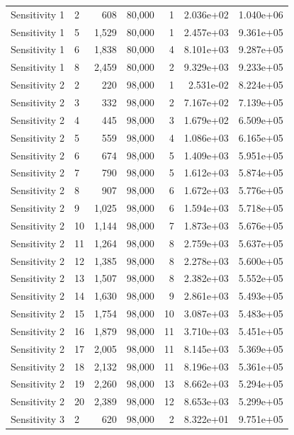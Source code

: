 \begin{xltabular}{\linewidth}{llrrrrr}
 Sensitivity 1 & 2 & 608 &  80,000 &   1 & 2.036e+02 & 1.040e+06 \\
 Sensitivity 1 & 5 & 1,529 &  80,000 &   1 & 2.457e+03 & 9.361e+05 \\
 Sensitivity 1 & 6 & 1,838 &  80,000 &   4 & 8.101e+03 & 9.287e+05 \\
 Sensitivity 1 & 8 & 2,459 &  80,000 &   2 & 9.329e+03 & 9.233e+05 \\
 Sensitivity 2 & 2 & 220 &  98,000 &   1 & 2.531e-02 & 8.224e+05 \\
 Sensitivity 2 & 3 & 332 &  98,000 &   2 & 7.167e+02 & 7.139e+05 \\
 Sensitivity 2 & 4 & 445 &  98,000 &   3 & 1.679e+02 & 6.509e+05 \\
 Sensitivity 2 & 5 & 559 &  98,000 &   4 & 1.086e+03 & 6.165e+05 \\
 Sensitivity 2 & 6 & 674 &  98,000 &   5 & 1.409e+03 & 5.951e+05 \\
 Sensitivity 2 & 7 & 790 &  98,000 &   5 & 1.612e+03 & 5.874e+05 \\
 Sensitivity 2 & 8 & 907 &  98,000 &   6 & 1.672e+03 & 5.776e+05 \\
 Sensitivity 2 & 9 & 1,025 &  98,000 &   6 & 1.594e+03 & 5.718e+05 \\
 Sensitivity 2 & 10 & 1,144 &  98,000 &   7 & 1.873e+03 & 5.676e+05 \\
 Sensitivity 2 & 11 & 1,264 &  98,000 &   8 & 2.759e+03 & 5.637e+05 \\
 Sensitivity 2 & 12 & 1,385 &  98,000 &   8 & 2.278e+03 & 5.600e+05 \\
 Sensitivity 2 & 13 & 1,507 &  98,000 &   8 & 2.382e+03 & 5.552e+05 \\
 Sensitivity 2 & 14 & 1,630 &  98,000 &   9 & 2.861e+03 & 5.493e+05 \\
 Sensitivity 2 & 15 & 1,754 &  98,000 &   10 & 3.087e+03 & 5.483e+05 \\
 Sensitivity 2 & 16 & 1,879 &  98,000 &   11 & 3.710e+03 & 5.451e+05 \\
 Sensitivity 2 & 17 & 2,005 &  98,000 &   11 & 8.145e+03 & 5.369e+05 \\
 Sensitivity 2 & 18 & 2,132 &  98,000 &   11 & 8.196e+03 & 5.361e+05 \\
 Sensitivity 2 & 19 & 2,260 &  98,000 &   13 & 8.662e+03 & 5.294e+05 \\
 Sensitivity 2 & 20 & 2,389 &  98,000 &   12 & 8.653e+03 & 5.299e+05 \\
 Sensitivity 3 & 2 & 620 &  98,000 &   2 & 8.322e+01 & 9.751e+05 \\

\end{xltabular}
